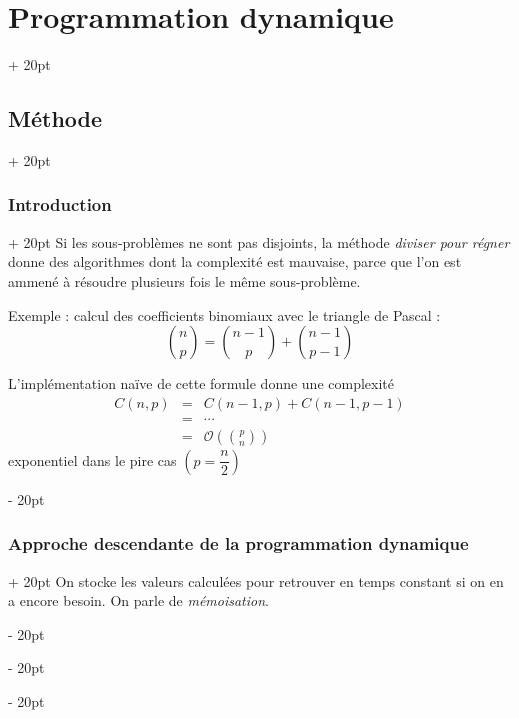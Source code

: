 \documentclass[a4paper, 12pt, twoside]{article}
\newcommand{\lr}[1]{\left( #1 \right)}
\newcommand{\ind}[1][20pt]{\advance\leftskip + #1}
\newcommand{\deind}[1][20pt]{\advance\leftskip - #1}
\newenvironment{indt}[2][20pt]{#2 \par \ind[#1]}{\par \deind} %
\begin{document}
    \begin{indt}{\section{Programmation dynamique}}
        
        \begin{indt}{\subsection{Méthode}}
            \begin{indt}{\subsubsection{Introduction}}
                Si les sous-problèmes ne sont pas disjoints, la méthode \textit{diviser pour régner} donne des algorithmes dont la complexité est mauvaise, parce que l'on est ammené à résoudre plusieurs fois le même sous-problème.
                
                \vspace{6pt}
                
                Exemple : calcul des coefficients binomiaux avec le triangle de Pascal :
                    \[ \binom n p = \binom{n - 1}{p} + \binom{n - 1}{p - 1} \]
                
                L'implémentation naïve de cette formule donne une complexité
                    \[
                        \begin{array}{rcl}
                            C(n, p) &=& C(n - 1, p) + C(n - 1, p - 1)
                            \\
                            &=& \cdots
                            \\
                            &=& \displaystyle \mathcal O\lr{\binom p n}
                        \end{array}
                    \]
                exponentiel dans le pire cas $\lr{p = \dfrac n 2}$
            \end{indt}
            
            \vspace{12pt}
            
            \begin{indt}{\subsubsection{Approche descendante de la programmation dynamique}}
                On stocke les valeurs calculées pour retrouver en temps constant si on en a encore besoin. On parle de \textit{mémoisation}.
                

\end{indt}
\end{indt}
\end{indt}
\end{document}
